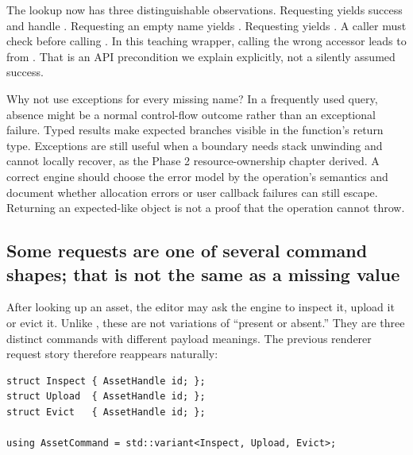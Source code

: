 The lookup now has three distinguishable observations. Requesting  yields success and handle . Requesting an empty name yields . Requesting  yields . A caller must check  before calling . In this teaching wrapper, calling the wrong accessor leads to  from . That is an API precondition we explain explicitly, not a silently assumed success.

Why not use exceptions for every missing name? In a frequently used query, absence might be a normal control-flow outcome rather than an exceptional failure. Typed results make expected branches visible in the function's return type. Exceptions are still useful when a boundary needs stack unwinding and cannot locally recover, as the Phase 2 resource-ownership chapter derived. A correct engine should choose the error model by the operation's semantics and document whether allocation errors or user callback failures can still escape. Returning an expected-like object is not a proof that the operation cannot throw.

\subsection{Some requests are one of several command shapes; that is not the same as a missing value}\label{05-engine-i-ch006-some-requests-are-one-of-several-command-shapes-that-is-not-the-same-as-a-missing-value}

\hypertarget{05-engine-i-ch006-some-requests-are-one-of-several-command-shapes-that-is-not-the-same-as-a-missing-value}{}

After looking up an asset, the editor may ask the engine to inspect it, upload it or evict it. Unlike , these are not variations of ``present or absent.'' They are three distinct commands with different payload meanings. The previous renderer request story therefore reappears naturally:

\begin{verbatim}
struct Inspect { AssetHandle id; };
struct Upload  { AssetHandle id; };
struct Evict   { AssetHandle id; };

using AssetCommand = std::variant<Inspect, Upload, Evict>;
\end{verbatim}

